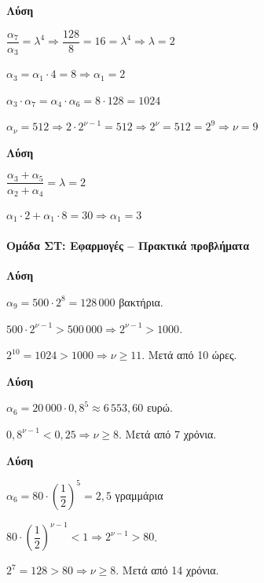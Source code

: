 \documentclass[11pt,a4paper,modern]{FFExercises}
\begin{document}
\askhsh
\textbf{Λύση}
\begin{alist}
  \item $\dfrac{\alpha_7}{\alpha_3} = \lambda^4 \Rightarrow \dfrac{128}{8} = 16 = \lambda^4 \Rightarrow \lambda = 2$
  
  $\alpha_3 = \alpha_1 \cdot 4 = 8 \Rightarrow \alpha_1 = 2$
  
  \item $\alpha_3 \cdot \alpha_7 = \alpha_4 \cdot \alpha_6 = 8 \cdot 128 = 1024$
  
  \item $\alpha_\nu = 512 \Rightarrow 2 \cdot 2^{\nu-1} = 512 \Rightarrow 2^\nu = 512 = 2^9 \Rightarrow \nu = 9$
\end{alist}

\askhsh
\textbf{Λύση}

$\dfrac{\alpha_3 + \alpha_5}{\alpha_2 + \alpha_4} = \lambda = 2$

$\alpha_1 \cdot 2 + \alpha_1 \cdot 8 = 30 \Rightarrow \alpha_1 = 3$


\paragraph{Ομάδα ΣΤ: Εφαρμογές -- Πρακτικά προβλήματα}

\askhsh
\textbf{Λύση}
\begin{alist}
  \item $\alpha_9 = 500 \cdot 2^8 = 128\,000$ βακτήρια.
  
  \item $500 \cdot 2^{\nu-1} > 500\,000 \Rightarrow 2^{\nu-1} > 1000$.
  
  $2^{10} = 1024 > 1000 \Rightarrow \nu \geq 11$. Μετά από 10 ώρες.
\end{alist}

\askhsh
\textbf{Λύση}
\begin{alist}
  \item $\alpha_6 = 20\,000 \cdot 0{,}8^5 \approx 6\,553{,}60$ ευρώ.
  
  \item $0{,}8^{\nu-1} < 0{,}25 \Rightarrow \nu \geq 8$. Μετά από 7 χρόνια.
\end{alist}

\askhsh
\textbf{Λύση}
\begin{alist}
  \item $\alpha_6 = 80 \cdot \left(\dfrac{1}{2}\right)^5 = 2{,}5$ γραμμάρια
  
  \item $80 \cdot \left(\dfrac{1}{2}\right)^{\nu-1} < 1 \Rightarrow 2^{\nu-1} > 80$.
  
  $2^7 = 128 > 80 \Rightarrow \nu \geq 8$. Μετά από 14 χρόνια.
\end{alist}
\end{document}
